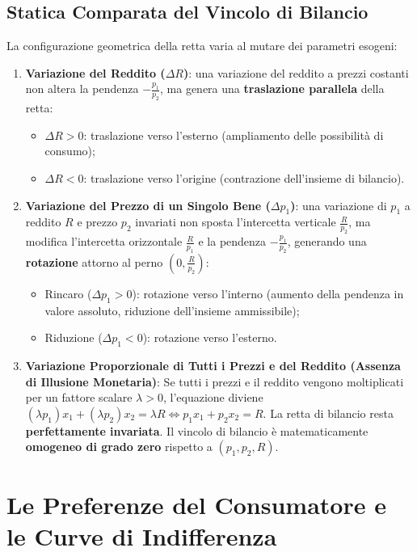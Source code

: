 \subsection{Statica Comparata del Vincolo di Bilancio}
La configurazione geometrica della retta varia al mutare dei parametri esogeni:
\begin{enumerate}
    \item \textbf{Variazione del Reddito ($\Delta R$)}: una variazione del reddito a prezzi costanti non altera la pendenza $-\frac{p_1}{p_2}$, ma genera una \textbf{traslazione parallela} della retta:
    \begin{itemize}
        \item $\Delta R > 0$: traslazione verso l'esterno (ampliamento delle possibilità di consumo);
        \item $\Delta R < 0$: traslazione verso l'origine (contrazione dell'insieme di bilancio).
    \end{itemize}
    
    \item \textbf{Variazione del Prezzo di un Singolo Bene ($\Delta p_1$)}: una variazione di $p_1$ a reddito $R$ e prezzo $p_2$ invariati non sposta l'intercetta verticale $\frac{R}{p_2}$, ma modifica l'intercetta orizzontale $\frac{R}{p_1}$ e la pendenza $-\frac{p_1}{p_2}$, generando una \textbf{rotazione} attorno al perno $\left(0, \frac{R}{p_2}\right)$:
    \begin{itemize}
        \item Rincaro ($\Delta p_1 > 0$): rotazione verso l'interno (aumento della pendenza in valore assoluto, riduzione dell'insieme ammissibile);
        \item Riduzione ($\Delta p_1 < 0$): rotazione verso l'esterno.
    \end{itemize}
    
    \item \textbf{Variazione Proporzionale di Tutti i Prezzi e del Reddito (Assenza di Illusione Monetaria)}:
    Se tutti i prezzi e il reddito vengono moltiplicati per un fattore scalare $\lambda > 0$, l'equazione diviene $(\lambda p_1) x_1 + (\lambda p_2) x_2 = \lambda R \iff p_1 x_1 + p_2 x_2 = R$.
    La retta di bilancio resta \textbf{perfettamente invariata}. Il vincolo di bilancio è matematicamente \textbf{omogeneo di grado zero} rispetto a $(p_1, p_2, R)$.
\end{enumerate}

\section{Le Preferenze del Consumatore e le Curve di Indifferenza}

